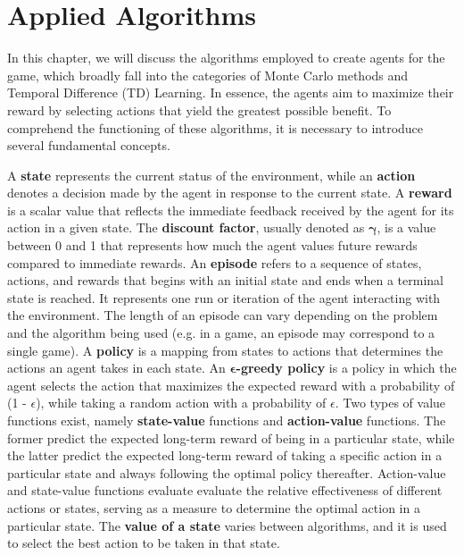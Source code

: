 \chapter{Applied Algorithms}
In this chapter, we will discuss the algorithms employed to create agents for the game, which broadly fall into the categories of Monte Carlo methods and Temporal Difference (TD) Learning. In essence, the agents aim to maximize their reward by selecting actions that yield the greatest possible benefit. To comprehend the functioning of these algorithms, it is necessary to introduce several fundamental concepts. 

A \textbf{state} represents the current status of the environment, while an \textbf{action} denotes a decision made by the agent in response to the current state. A \textbf{reward} is a scalar value that reflects the immediate feedback received by the agent for its action in a given state. The \textbf{discount factor}, usually denoted as $\bm{\gamma}$, is a value between 0 and 1 that represents how much the agent values future rewards compared to immediate rewards. An \textbf{episode} refers to a sequence of states, actions, and rewards that begins with an initial state and ends when a terminal state is reached. It represents one run or iteration of the agent interacting with the environment. The length of an episode can vary depending on the problem and the algorithm being used (e.g. in a game, an episode may correspond to a single game). A \textbf{policy} is a mapping from states to actions that determines the actions an agent takes in each state. An \textbf{$\bm{\epsilon}$-greedy policy} is a policy in which the agent selects the action that maximizes the expected reward with a probability of (1 - $\epsilon$), while taking a random action with a probability of $\epsilon$. Two types of value functions exist, namely \textbf{state-value} functions and \textbf{action-value} functions. The former predict the expected long-term reward of being in a particular state, while the latter predict the expected long-term reward of taking a specific action in a particular state and always following the optimal policy thereafter. Action-value and state-value functions evaluate evaluate the relative effectiveness of different actions or states, serving as a measure to determine the optimal action in a particular state. The \textbf{value of a state} varies between algorithms, and it is used to select the best action to be taken in that state. 

